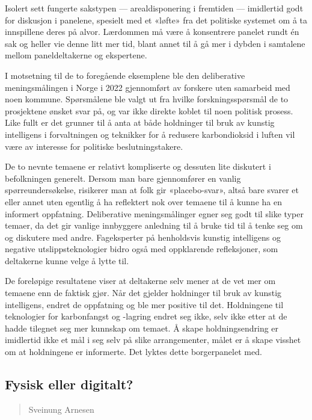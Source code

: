\documentclass[
  12pt,
  a4paper, 12pt]{article}
\begin{document}
Isolert sett fungerte sakstypen --- arealdisponering i fremtiden --- imidlertid godt for diskusjon i panelene, spesielt med et «løfte» fra det politiske systemet om å ta innspillene deres på alvor. Lærdommen må være å konsentrere panelet rundt én sak og heller vie denne litt mer tid, blant annet til å gå mer i dybden i samtalene mellom paneldeltakerne og ekspertene.

I motsetning til de to foregående eksemplene ble den deliberative meningsmålingen i Norge i 2022 gjennomført av forskere uten samarbeid med noen kommune. Spørsmålene ble valgt ut fra hvilke forskningsspørsmål de to prosjektene ønsket svar på, og var ikke direkte koblet til noen politisk prosess. Like fullt er det grunner til å anta at både holdninger til bruk av kunstig intelligens i forvaltningen og teknikker for å redusere karbondioksid i luften vil være av interesse for politiske beslutningstakere.

De to nevnte temaene er relativt kompliserte og dessuten lite diskutert i befolkningen generelt. Dersom man bare gjennomfører en vanlig spørreundersøkelse, risikerer man at folk gir «placebo-svar», altså bare svarer et eller annet uten egentlig å ha reflektert nok over temaene til å kunne ha en informert oppfatning. Deliberative meningsmålinger egner seg godt til slike typer temaer, da det gir vanlige innbyggere anledning til å bruke tid til å tenke seg om og diskutere med andre. Fageksperter på henholdsvis kunstig intelligens og negative utslippsteknologier bidro også med oppklarende refleksjoner, som deltakerne kunne velge å lytte til.

De foreløpige resultatene viser at deltakerne selv mener at de vet mer om temaene enn de faktisk gjør. Når det gjelder holdninger til bruk av kunstig intelligens, endret de oppfatning og ble mer positive til det. Holdningene til teknologier for karbonfangst og -lagring endret seg ikke, selv ikke etter at de hadde tilegnet seg mer kunnskap om temaet. Å skape holdningsendring er imidlertid ikke et mål i seg selv på slike arrangementer, målet er å skape visshet om at holdningene er informerte. Det lyktes dette borgerpanelet med.

\newpage

\hypertarget{fysisk-eller-digitalt}{%
\subsection{Fysisk eller digitalt?}\label{fysisk-eller-digitalt}}

\begin{quote}
Sveinung Arnesen
\end{quote}
\end{document}
